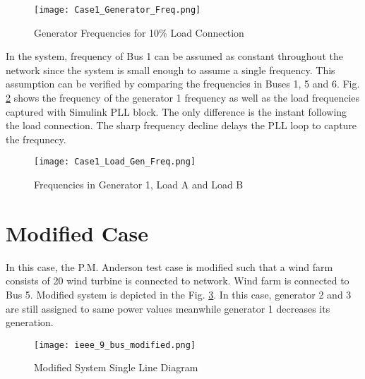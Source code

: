 \begin{figure}[h!]
	\centering
	\texttt{[image: Case1\_Generator\_Freq.png]}
	\caption{Generator Frequencies for 10\% Load Connection}
	\label{genfreqcase1}
\end{figure}
In the system, frequency of Bus 1 can be assumed as constant throughout the network since the system is small enough to assume a single frequency. This assumption can be verified by comparing the frequencies in Buses 1, 5 and 6. Fig. \ref{genfreqcase1_loadgen} shows the frequency of the generator 1 frequency as well as the load frequencies captured with Simulink PLL block. The only difference is the instant following the load connection. The sharp frequency decline delays the PLL loop to capture the frequnecy. 
\begin{figure}[h!]
	\centering
	\texttt{[image: Case1\_Load\_Gen\_Freq.png]}
	\caption{Frequencies in Generator 1, Load A and Load B}
	\label{genfreqcase1_loadgen}
\end{figure}
\section{Modified Case}
In this case, the P.M. Anderson test case is modified such that a wind farm consists of 20 wind turbine is connected to network. Wind farm is connected to Bus 5. Modified system is depicted in the Fig. \ref{ieee_9_bus_case2}. In this case, generator 2 and 3 are still assigned to same power values meanwhile generator 1 decreases its generation. 
\begin{figure}[h!]
	\centering
	\texttt{[image: ieee\_9\_bus\_modified.png]}
	\caption{Modified System Single Line Diagram}
	\label{ieee_9_bus_case2}
\end{figure}
